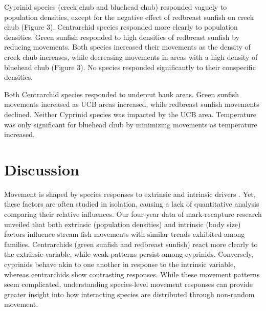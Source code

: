 \documentclass[11pt, class=article, crop=false]{standalone}
\begin{document}
Cyprinid species (creek chub and bluehead chub) responded vaguely to population densities, except for the negative effect of redbreast sunfish on creek chub (Figure 3). Centrarchid species responded more clearly to population densities. Green sunfish responded to high densities of redbreast sunfish by reducing movements. Both species increased their movements as the density of creek chub increases, while decreasing movements in areas with a high density of bluehead chub (Figure 3). No species responded significantly to their conspecific densities.

Both Centrarchid species responded to undercut bank areas. Green sunfish movements increased as UCB areas increased, while redbreast sunfish movements declined. Neither Cyprinid species was impacted by the UCB area. Temperature was only significant for bluehead chub by minimizing movements as temperature increased. 

\section{Discussion}

Movement is shaped by species responses to extrinsic and intrinsic drivers \citep{clobertDispersalEcologyEvolution2012}. Yet, these factors are often studied in isolation, causing a lack of quantitative analysis comparing their relative influences. Our four-year data of mark-recapture research unveiled that both extrinsic (population densities) and intrinsic (body size) factors influence stream fish movements with similar trends exhibited among families. Centrarchids (green sunfish and redbreast sunfish) react more clearly to the extrinsic variable, while weak patterns persist among cyprinids. Conversely, cyprinids behave akin to one another in response to the intrinsic variable, whereas centrarchids show contrasting responses. While these movement patterns seem complicated, understanding species-level movement responses can provide greater insight into how interacting species are distributed through non-random movement. 
\end{document}
